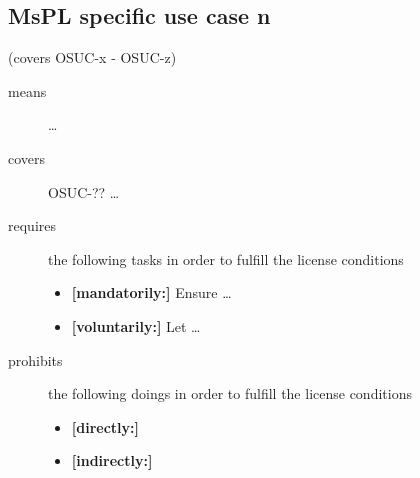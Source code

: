\subsection{MsPL specific use case n}
(covers OSUC-x - OSUC-z)
\begin{description}
\item[means] \ldots

\item[covers] OSUC-?? \ldots

\item[requires] the following tasks in order to fulfill the license conditions
\begin{itemize}
  \item \textbf{[mandatorily:]} Ensure \ldots
  \item \textbf{[voluntarily:]} Let \ldots
\end{itemize}

\item[prohibits] the following doings in order to fulfill the license conditions
\begin{itemize}
  \item \textbf{[directly:]} 
  \item \textbf{[indirectly:]}
\end{itemize}
\end{description}


%
